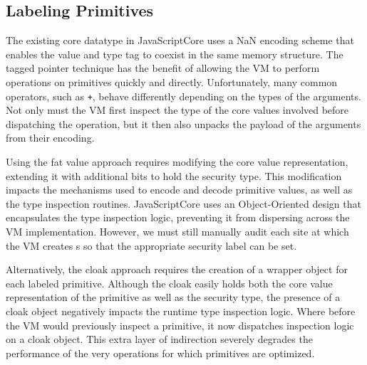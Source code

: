 \subsection{Labeling Primitives}\label{sec:primitives}


The existing core datatype in JavaScriptCore uses a NaN encoding scheme that enables the value and type tag to coexist in the same memory structure.
The tagged pointer technique has the benefit of allowing the VM to perform operations on primitives quickly and directly.
Unfortunately, many common operators, such as \texttt{+}, behave differently depending on the types of the arguments.
Not only must the VM first inspect the type of the core values involved before dispatching the operation, but it then also unpacks the payload of the arguments from their encoding.

Using the fat value approach requires modifying the core value representation, extending it with additional bits to hold the security type.
This modification impacts the mechanisms used to encode and decode primitive values, as well as the type inspection routines.
JavaScriptCore uses an Object-Oriented design that encapsulates the type inspection logic, preventing it from dispersing across the VM implementation.
However, we must still manually audit each site at which the VM creates s so that the appropriate security label can be set.

Alternatively, the cloak approach requires the creation of a wrapper object for each labeled primitive.
Although the cloak easily holds both the core value representation of the primitive as well as the security type, the presence of a cloak object negatively impacts the runtime type inspection logic.
Where before the VM would previously inspect a primitive, it now dispatches inspection logic on a cloak object.
This extra layer of indirection severely degrades the performance of the very operations for which primitives are optimized.

